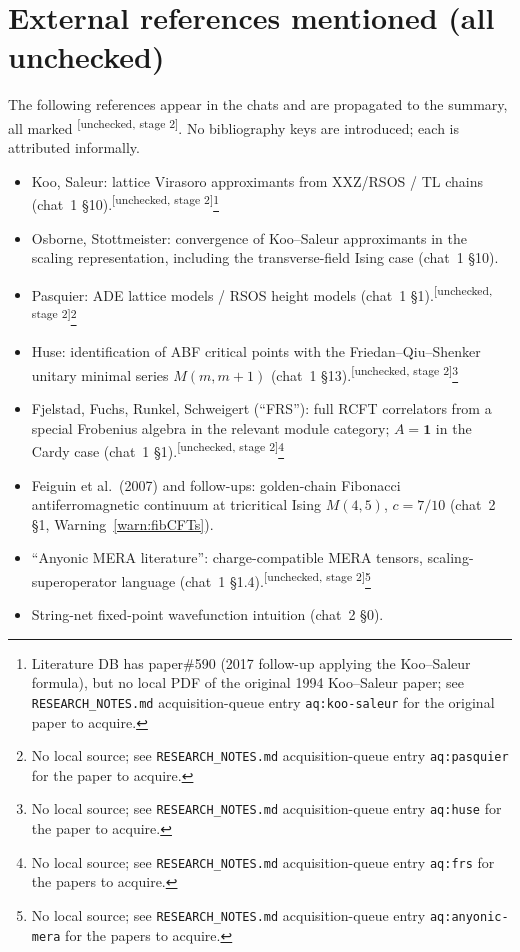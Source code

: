 \documentclass[11pt,a4paper]{article}
\theoremstyle{definition}
\newcommand{\one}{\mathbf{1}}
\newcommand{\unchecked}{\textsuperscript{\textcolor{red!70!black}{[unchecked, stage 2]}}}
\begin{document}
\section*{External references mentioned (all unchecked)}

The following references appear in the chats and are propagated to the
summary, all marked \unchecked. No bibliography keys are introduced; each is
attributed informally.
\begin{itemize}
\item Koo, Saleur: lattice Virasoro approximants from XXZ/RSOS / TL chains
      (chat~1 §10).\unchecked\footnote{Literature DB has paper\#590 (2017 follow-up applying the Koo--Saleur formula), but no local PDF of the original 1994 Koo--Saleur paper; see \texttt{RESEARCH\_NOTES.md} acquisition-queue entry \texttt{aq:koo-saleur} for the original paper to acquire.}
\item Osborne, Stottmeister: convergence of Koo--Saleur approximants in the
      scaling representation, including the transverse-field Ising case
      (chat~1 §10).\cite{SRC-OAR-FERMIONS,SRC-OAR-WAVELETS,SRC-OSBORNE-CONTINUUM}
\item Pasquier: ADE lattice models / RSOS height models (chat~1 §1).\unchecked\footnote{No local source; see \texttt{RESEARCH\_NOTES.md} acquisition-queue entry \texttt{aq:pasquier} for the paper to acquire.}
\item Huse: identification of ABF critical points with the Friedan--Qiu--Shenker
      unitary minimal series $M(m, m+1)$ (chat~1 §13).\unchecked\footnote{No local source; see \texttt{RESEARCH\_NOTES.md} acquisition-queue entry \texttt{aq:huse} for the paper to acquire.}
\item Fjelstad, Fuchs, Runkel, Schweigert (``FRS''): full RCFT correlators
      from a special Frobenius algebra in the relevant module category;
      $A = \one$ in the Cardy case (chat~1 §1).\unchecked\footnote{No local source; see \texttt{RESEARCH\_NOTES.md} acquisition-queue entry \texttt{aq:frs} for the papers to acquire.}
\item Feiguin et al.\ (2007) and follow-ups: golden-chain Fibonacci
      antiferromagnetic continuum at tricritical Ising $M(4,5)$, $c = 7/10$
      (chat~2 §1, Warning~\ref{warn:fibCFTs}).\cite{SRC-GOLDEN-CHAIN}
\item ``Anyonic MERA literature'': charge-compatible MERA tensors,
      scaling-superoperator language (chat~1 §1.4).\unchecked\footnote{No local source; see \texttt{RESEARCH\_NOTES.md} acquisition-queue entry \texttt{aq:anyonic-mera} for the papers to acquire.}
\item String-net fixed-point wavefunction intuition (chat~2 §0).\cite{SRC-STRING-NET}
\end{itemize}
\end{document}
